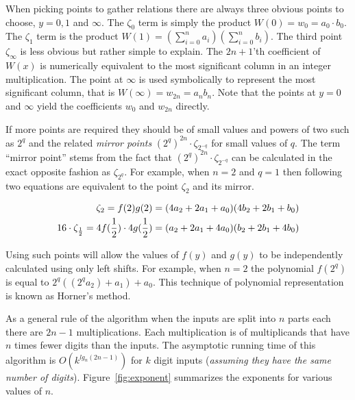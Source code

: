 \documentclass[b5paper]{book}
\begin{document}
When picking points to gather relations there are always three obvious points to choose, $y = 0, 1$ and $ \infty$.  The $\zeta_0$ term
is simply the product $W(0) = w_0 = a_0 \cdot b_0$.  The $\zeta_1$ term is the product 
$W(1) = \left (\sum_{i = 0}^{n} a_i \right ) \left (\sum_{i = 0}^{n} b_i \right )$.  The third point $\zeta_{\infty}$ is less obvious but rather
simple to explain.  The $2n + 1$'th coefficient of $W(x)$ is numerically equivalent to the most significant column in an integer multiplication.  
The point at $\infty$ is used symbolically to represent the most significant column, that is $W(\infty) = w_{2n} = a_nb_n$.  Note that the 
points at $y = 0$ and $\infty$ yield the coefficients $w_0$ and $w_{2n}$ directly.

If more points are required they should be of small values and powers of two such as $2^q$ and the related \textit{mirror points} 
$\left (2^q \right )^{2n}  \cdot \zeta_{2^{-q}}$ for small values of $q$.  The term ``mirror point'' stems from the fact that 
$\left (2^q \right )^{2n}  \cdot \zeta_{2^{-q}}$ can be calculated in the exact opposite fashion as $\zeta_{2^q}$.  For
example, when $n = 2$ and $q = 1$ then following two equations are equivalent to the point $\zeta_{2}$ and its mirror.

\begin{eqnarray}
\zeta_{2}                  = f(2)g(2) = (4a_2 + 2a_1 + a_0)(4b_2 + 2b_1 + b_0) \nonumber \\
16 \cdot \zeta_{1 \over 2} = 4f({1\over 2}) \cdot 4g({1 \over 2}) = (a_2 + 2a_1 + 4a_0)(b_2 + 2b_1 + 4b_0)
\end{eqnarray}

Using such points will allow the values of $f(y)$ and $g(y)$ to be independently calculated using only left shifts.  For example, when $n = 2$ the
polynomial $f(2^q)$ is equal to $2^q((2^qa_2) + a_1) + a_0$.  This technique of polynomial representation is known as Horner's method.  

As a general rule of the algorithm when the inputs are split into $n$ parts each there are $2n - 1$ multiplications.  Each multiplication is of 
multiplicands that have $n$ times fewer digits than the inputs.  The asymptotic running time of this algorithm is 
$O \left ( k^{lg_n(2n - 1)} \right )$ for $k$ digit inputs (\textit{assuming they have the same number of digits}).  Figure~\ref{fig:exponent}
summarizes the exponents for various values of $n$.
\end{document}
